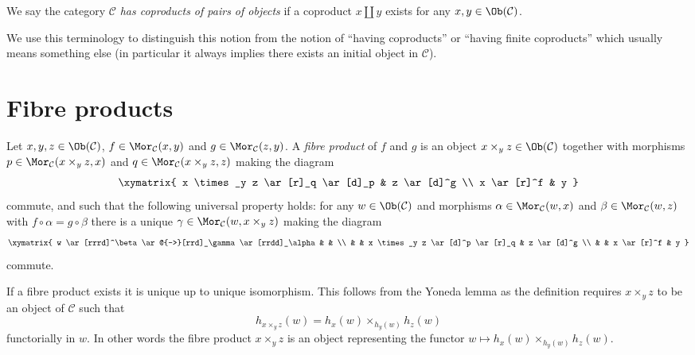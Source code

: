 \begin{definition}
\label{definition-has-coproducts-of-pairs}
We say the category $\mathcal{C}$ {\it has coproducts of pairs
of objects} if a coproduct $x \amalg y$
exists for any $x, y \in \Ob(\mathcal{C})$.
\end{definition}

\noindent
We use this terminology to distinguish this notion from the notion
of ``having coproducts'' or ``having finite coproducts'' which usually means
something else (in particular it always implies there exists an
initial object in $\mathcal{C}$).





\section{Fibre products}
\label{section-fibre-products}

\begin{definition}
\label{definition-fibre-products}
Let $x, y, z\in \Ob(\mathcal{C})$,
$f\in \Mor_\mathcal{C}(x, y)$
and $g\in \Mor_{\mathcal C}(z, y)$.
A {\it fibre product} of $f$ and $g$ is
an object $x \times_y z\in \Ob(\mathcal{C})$
together with morphisms
$p \in \Mor_{\mathcal C}(x \times_y z, x)$ and
$q \in \Mor_{\mathcal C}(x \times_y z, z)$ making the diagram
$$
\xymatrix{
x \times_y z \ar[r]_q \ar[d]_p & z \ar[d]^g \\
x \ar[r]^f & y
}
$$
commute, and such that the following universal property holds: for
any $w\in \Ob(\mathcal{C})$ and morphisms
$\alpha \in \Mor_{\mathcal C}(w, x)$ and
$\beta \in \Mor_\mathcal{C}(w, z)$ with
$f \circ \alpha = g \circ \beta$
there is a unique
$\gamma \in \Mor_{\mathcal C}(w, x \times_y z)$ making
the diagram
$$
\xymatrix{
w \ar[rrrd]^\beta \ar@{-->}[rrd]_\gamma \ar[rrdd]_\alpha & & \\
& & x \times_y z \ar[d]^p \ar[r]_q & z \ar[d]^g \\
& & x \ar[r]^f & y
}
$$
commute.
\end{definition}

\noindent
If a fibre product exists it is unique up to unique
isomorphism. This follows from the Yoneda lemma as
the definition requires $x \times_y z$ to be an object
of $\mathcal{C}$ such that
$$
h_{x \times_y z}(w) = h_x(w) \times_{h_y(w)} h_z(w)
$$
functorially in $w$. In other words the fibre product $x \times_y z$
is an object representing the functor
$w \mapsto h_x(w) \times_{h_y(w)} h_z(w)$.

